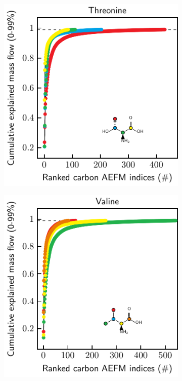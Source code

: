 \documentclass[]{article}
\begin{document}
\begin{figure}
    \begin{subfigure}[t]{0.247\textwidth}
        \caption{}
        \includegraphics[width=\textwidth]{subpanels/cumulative-source-met-35-legend.pdf}\\
    \end{subfigure}
    \begin{subfigure}[t]{0.247\textwidth}
        \caption{}
        \includegraphics[width=\textwidth]{subpanels/cumulative-source-met-40-legend.pdf}\\
    \end{subfigure}

\end{figure}
\end{document}
